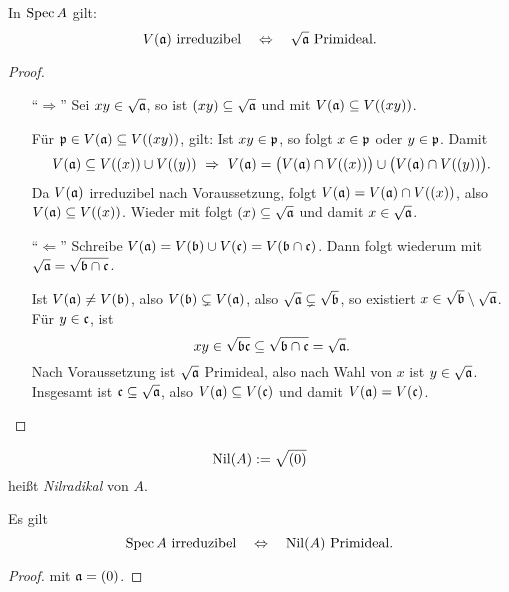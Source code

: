 \begin{lemma}
	\label{lemma:v irreduzibel <=> radikal prim}
	In $\operatorname{Spec} A$ gilt:
	\[
		V(\mathfrak{a}) \text{ irreduzibel} \quad\Leftrightarrow\quad
		\sqrt{\mathfrak{a}} \text{ Primideal}.
	\]
\end{lemma}
\begin{proof}
	\begin{itemize}
	  \item["`$\Rightarrow$"']
	  	Sei $xy \in \sqrt{\mathfrak{a}}$, so ist $(xy) \subseteq \sqrt{\mathfrak{a}}$ und mit
	  	 $V(\mathfrak{a}) \subseteq V((xy))$.
	  	
	  	Für $\mathfrak{p}\in V(\mathfrak{a}) \subseteq V((xy))$, gilt:
	  	Ist $xy \in \mathfrak{p}$, so folgt $x \in \mathfrak{p}$ oder $y\in \mathfrak{p}$. Damit
	  	\[
	  		V(\a) \subseteq V((x)) \cup V((y))
	  		\ \Rightarrow\ 
	  		V(\a) = \big(V(\a) \cap V((x))\big) \cup 
	  				\big(V(\a) \cap V((y))\big).
	  	\]
	  	Da $V(\mathfrak{a})$ irreduzibel nach Voraussetzung, folgt
	  	\obda $V(\mathfrak{a}) = V(\mathfrak{a}) \cap V((x))$, also $V(\mathfrak{a}) \subseteq V((x))$.
	  	Wieder mit \thref{satz:v und radikal} folgt
	  	$(x) \subseteq \sqrt{\mathfrak{a}}$ und damit $x \in \sqrt{\mathfrak{a}}$. 
	 \item["`$\Leftarrow$"']
	 	Schreibe $V(\mathfrak{a}) = V(\mathfrak{b}) \cup V(\mathfrak c) = V(\mathfrak{b}\cap \mathfrak c)$.
	 	Dann folgt wiederum mit 
	 	$\sqrt{\mathfrak{a}} = \sqrt{\mathfrak{b} \cap \mathfrak c}$.
	 	
	 	Ist $V(\mathfrak{a}) \neq V(\mathfrak{b})$, also $V(\mathfrak{b}) \subsetneq V(\mathfrak{a})$, also
	 	$\sqrt{\mathfrak{a}} \subsetneq \sqrt{\mathfrak{b}}$, so existiert 
	 	$x\in \sqrt{\mathfrak{b}} \setminus \sqrt{\mathfrak{a}}$. Für $y \in \mathfrak c$, ist 
	 	\[
	 		xy \in \sqrt{\mathfrak{b}\mathfrak c} \subseteq \sqrt{\mathfrak{b} \cap \mathfrak c} = \sqrt{\mathfrak{a}}.
	 	\]
	 	Nach Voraussetzung ist $\sqrt{\mathfrak{a}}$ Primideal, also 
	 	nach Wahl von $x$ ist $y\in \sqrt{\mathfrak{a}}$.
	 	Insgesamt ist $\mathfrak c \subseteq \sqrt{\mathfrak{a}}$, also
	 	$V(\mathfrak{a}) \subseteq V(\mathfrak c)$	und damit $V(\mathfrak{a}) = V(\mathfrak c)$.
	\end{itemize}
\end{proof}

\begin{definition}[Nilradikal]
	\[
		\operatorname{Nil}(A) := \sqrt{(0)}
	\]
	heißt \emph{Nilradikal} von $A$.
\end{definition}

\begin{korollar}
	Es gilt
	\[
		\operatorname{Spec} A \text{ irreduzibel}
		\quad\Leftrightarrow\quad
		\operatorname{Nil}(A) \text{ Primideal}.
	\]
\end{korollar}
\begin{proof}
	 mit $\mathfrak{a} = (0)$.
\end{proof}


